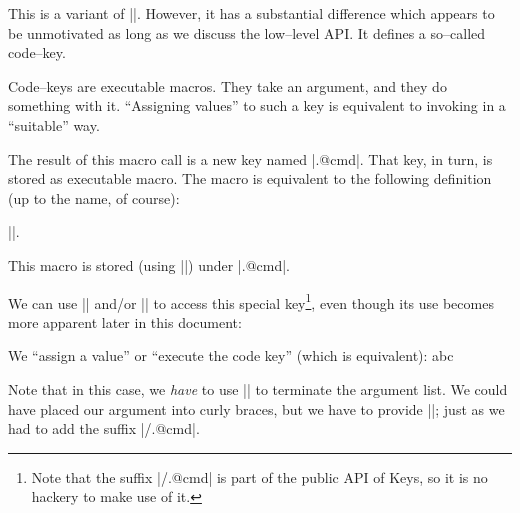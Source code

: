 \documentclass[a4paper]{ltxdoc}
\begin{document}

\begin{command}{\pgfkeysdef{}}
	This is a variant of |\pgfkeyssetvalue|. However, it has a substantial difference which appears to be unmotivated as long as we discuss the low--level API. It defines a so--called code--key.

	Code--keys are executable macros. They take an argument, and they do something with it. ``Assigning values'' to such a key is equivalent to invoking  in a ``suitable'' way.

	The result of this macro call is a new key named |.@cmd|. That key, in turn, is stored as executable macro. The macro is equivalent to the following definition (up to the name, of course):

	|\def\macro#1\pgfeov|.

	This macro is stored (using |\pgfkeyslet|) under |.@cmd|. 

	We can use |\pgfkeysgetvalue| and/or |\pgfkeysvalueof| to access this special key\footnote{Note that the suffix |/.@cmd| is part of the public API of \PGF Keys, so it is no hackery to make use of it.}, even though its use becomes more apparent later in this document: 

\begin{codeexample}[]
%

We ``assign a value'' or ``execute the code key'' (which is equivalent): 
abc\pgfeov
\end{codeexample}
	Note that in this case, we \emph{have} to use |\pgfeov| to terminate the argument list. We could have placed our argument into curly braces, but we have to provide |\pgfeov|; just as we had to add the suffix |/.@cmd|. 

\end{command}
\end{document}
